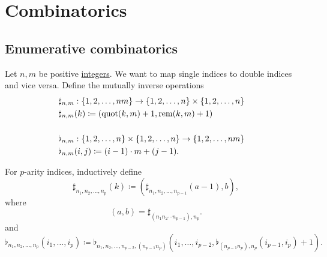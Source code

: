 \section{Combinatorics}\label{sec:combinatorics}
\subsection{Enumerative combinatorics}\label{subsec:enumerative_combinatorics}

\begin{definition}\label{def:double_index_maps}
  Let \( n, m \) be positive \hyperref[def:integers]{integers}. We want to map single indices to double indices and vice versa. Define the mutually inverse operations
  \begin{align*}
    &\sharp_{n,m}: \{ 1, 2, \ldots, nm \} \to \{ 1, 2, \ldots, n \} \times \{ 1, 2, \ldots, n \} \\
    &\sharp_{n,m}(k) \coloneqq (\operatorname{quot}(k, m) + 1, \operatorname{rem}(k, m) + 1)
    &\\
    &\\
    &\flat_{n,m}: \{ 1, 2, \ldots, n \} \times \{ 1, 2, \ldots, n \} \to \{ 1, 2, \ldots, nm \} \\
    &\flat_{n,m}(i, j) \coloneqq (i - 1) \cdot m + (j - 1).
  \end{align*}

  For \( p \)-arity indices, inductively define
  \begin{equation*}
    \sharp_{n_1, n_2, \ldots, n_p}(k) \coloneqq (\sharp_{n_1, n_2, \ldots, n_{p-1}}(a - 1), b),
  \end{equation*}
  where
  \begin{equation*}
    (a, b) = \sharp_{(n_1 n_2 \cdots n_{p-1}), n_p}.
  \end{equation*}
  and
  \begin{equation*}
    \flat_{n_1, n_2, \ldots, n_p}(i_1, \ldots, i_p) \coloneqq \flat_{n_1, n_2, \ldots, n_{p-2}, (n_{p-1} n_p)}(i_1, \ldots, i_{p-2}, \flat_{(n_{p-1} n_p), n_p}(i_{p-1}, i_p) + 1).
  \end{equation*}
\end{definition}

